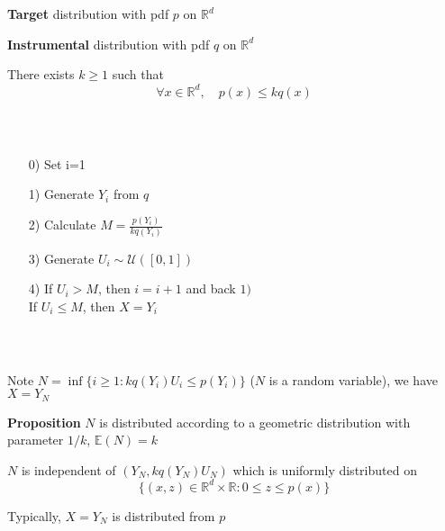 \documentclass[notes,professionalfont,11pt,usenames,dvipsnames]{beamer}
\renewcommand{\mathcal}{\mathscr}
\newcommand{\ds}{\displaystyle}
\renewcommand{\mathcal}{\mathscr}
\newcommand{\E}{\mathbb{E}}
\newcommand\justify{\rightskip0pt \leftskip0pt}
\newenvironment{slide}
{\begin{frame}[environment=slide]
\frametitle{\insertsection \\ \insertsubsection}\justify\setlength{\parskip}{0.5cm}\vspace{-0.5cm}}
{\end{frame}}
\begin{document}
\begin{slide}

{\bf Target} distribution with pdf $p$ on $\mathbb{R}^d$

{\bf Instrumental} distribution with pdf $q$ on $\mathbb{R}^d$ 

There exists $k\geq1$ such that
$$
\forall x\in\mathbb{R}^d,\quad p(x)\leq k q(x)
$$

\end{slide}

\begin{slide}

\begin{itemize}
\item[0)] Set i=1
\item[1)] Generate $Y_i$ from $q$
\item[2)] Calculate $\ds M=\frac{p(Y_i)}{kq(Y_i)}$
\item[3)] Generate $U_i\sim\mathcal{U}([0,1])$
\item[4)] If $U_i>M$, then $i=i+1$ and back $1)$ \\
If $U_i\leq M$, then $X=Y_i$
\end{itemize}

\end{slide}

\begin{slide}

Note $N=\inf\{i\geq 1: kq(Y_i)U_i\leq p(Y_i)\}$ ($N$ is a random variable),
we have $X=Y_N$

{\bf Proposition} $N$ is distributed according to a geometric distribution
with parameter $1/k$, $\E(N)=k$

$N$ is independent of $(Y_N,kq(Y_N)U_N)$ which is uniformly distributed on
$$
\{(x,z)\in\mathbb{R}^d\times \mathbb{R}:0\leq z\leq p(x)\}
$$

Typically, $X=Y_N$ is distributed from $p$

\end{slide}
\end{document}
